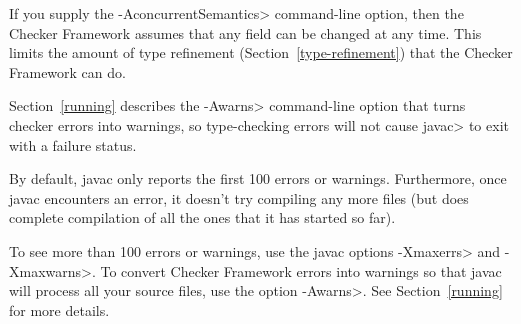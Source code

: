 If you supply the \<-AconcurrentSemantics> command-line option, then the
Checker Framework assumes that any field can be changed at any time.  This
limits the amount of type refinement
(Section~\ref{type-refinement}) that the Checker Framework can do.


%
%
%
%
%
%
%



Section~\ref{running} describes the \<-Awarns> command-line
option that turns checker errors into warnings, so type-checking errors
will not cause \<javac> to exit with a failure status.



By default, javac only reports the first 100 errors or warnings.
Furthermore, once javac encounters an error, it doesn't try compiling any
more files (but does complete compilation of all the ones that it has
started so far).

To see more than 100 errors or warnings, use the javac options \<-Xmaxerrs>
and \<-Xmaxwarns>.  To convert Checker Framework errors into warnings so
that javac will process all your source files, use the option \<-Awarns>.
See Section~\ref{running} for more details.


